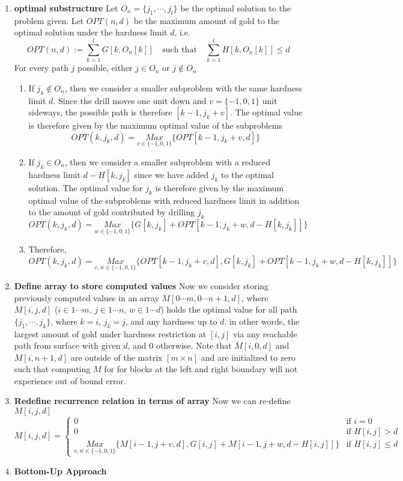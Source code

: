 \documentclass[11pt]{article}
\begin{document}
\begin{solution}
  \begin{enumerate}
    \item \textbf{optimal substructure} Let $O_n = \{ j_1,\cdots, j_l\}$ be the optimal solution to the problem given. Let $OPT(n, d)$ be the maximum amount of gold to the optimal solution under the hardness limit $d$, i.e.
    \[
      OPT(n, d) := \sum_{k=1}^{l} G[k, O_n[k]] \quad \text{such that}\quad \sum_{k=1}^{l} H[k, O_n[k]] \leq d
    \]
    For every path $j$ possible, either $j\in O_n$ or $j\not\in O_n$
    \begin{enumerate}
      \item If $j_k \not\in O_n$, then we consider a smaller subproblem with the same hardness limit $d$. Since the drill moves one unit down and $v = \{ -1, 0, 1\}$ unit sideways, the possible path is therefore $[k-1, j_k + v]$. The optimal value is therefore given by the maximum optimal value of the subproblems
      \[
        OPT(k, j_k, d) = \underset{v\in\{-1,0,1\}}{Max}\{ OPT[k-1, j_k + v, d]\}
      \]
      \item If $j_k \in O_n$, then we consider a smaller subproblem with a reduced hardness limit $d - H[k, j_k]$ since we have added $j_k$ to the optimal solution. The optimal value for $j_k$ is therefore given by the maximum optimal value of the subproblems with reduced hardness limit in addition to the amount of gold contributed by drilling $j_k$
      \[
        OPT(k, j_k, d) = \underset{w\in\{-1,0,1\}}{Max}\{ G[k, j_k] + OPT[k-1, j_k + w, d-H[k, j_k]]\}
      \]
      \item Therefore,
      \[
        OPT(k, j_k, d) = \underset{v, w\in\{-1,0,1\}}{Max}\{ OPT[k-1, j_k + v, d], G[k, j_k] + OPT[k-1, j_k + w, d-H[k, j_k]]\}
      \]
    \end{enumerate}

  \item \textbf{Define array to store computed values} Now we consider storing previously computed values in an array $M[0\cdots m, 0\cdots n + 1, d]$, where $M[i, j, d]$ ($i\in 1\cdots m$, $j\in 1\cdots n$, $w\in 1\cdots d$) holds the optimal value for all path $\{ j_1, \cdots, j_k\}$, where $k = i$, $j_k = j$, and any hardness up to $d$. in other words, the largest amount of gold under hardness restriction at $[i, j]$ via any reachable path from surface with given $d$, and 0 otherwise. Note that $M[i, 0, d]$ and $M[i, n+1, d]$ are outside of the matrix $[m\times n]$ and are initialized to zero such that computing $M$ for for blocks at the left and right boundary will not experience out of bound error.
  \item \textbf{Redefine recurrence relation in terms of array} Now we can re-define $M[i, j, d]$
  \[
    M[i, j, d] =
    \begin{cases}
      0 & \text{if } i = 0\\
      0 & \text{if } H[i, j] > d \\
      \underset{v, w\in\{-1,0,1\}}{Max}\{ M[i-1, j + v, d], G[i, j] + M[i-1, j + w, d-H[i, j]]\} & \text{if } H[i, j] \leq d
    \end{cases}
  \]
  \item \textbf{Bottom-Up Approach}


\end{enumerate}
\end{solution}
\end{document}
